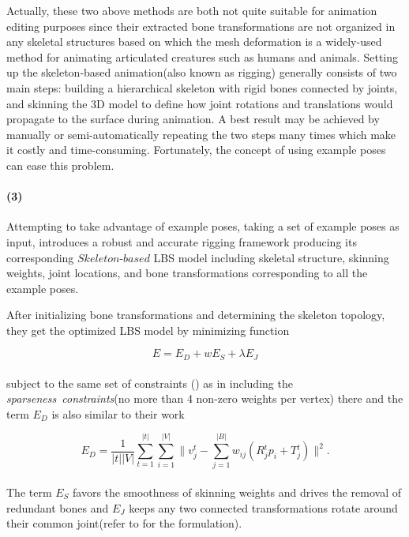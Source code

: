 \vspace{15pt}
Actually, these two above methods are both not quite suitable for animation editing purposes
since their extracted bone transformations are not organized in any skeletal structures
based on which the mesh deformation is a widely-used method for animating articulated creatures such as humans and animals.
Setting up the skeleton-based animation(also known as rigging) generally consists of two main steps:
building a hierarchical skeleton with rigid bones connected by joints,
and skinning the 3D model to define how joint rotations and translations would propagate to the surface during animation.
A best result may be achieved by manually or semi-automatically repeating the two steps many times which make it costly and time-consuming.
Fortunately, the concept of using example poses can ease this problem\cite{schaefer2007example}.

\paragraph{(3)}
Attempting to take advantage of example poses, taking a set of example poses as input,
\cite{le2014ras} introduces a robust and accurate rigging framework producing its corresponding $Skeleton$-$based$ LBS model including skeletal structure, skinning weights, joint locations, and bone transformations corresponding to all the example poses.

After initializing bone transformations and determining the skeleton topology, they get the optimized LBS model by minimizing function

\small{
\begin{equation}
 \label{eq:SkeletonLBS}
 E=E_{D}+wE_{S}+\lambda E_{J}
\end{equation}
}
\\
subject to the same set of constraints () as in \cite{le2012smooth} including the \textit{sparseness~constraints}(no more than 4 non-zero weights per vertex) there and  the term $E_{D}$ is also similar to their work

\small{
\begin{equation}
 \label{eq:SRFE}
 E_{D}=\frac{1}{|t||V|}
 \sum_{t=1}^{|t|} \sum_{i=1}^{|V|}
 \|v{_{j}^{t}}
 -\sum_{j=1}^{|B|} w_{ij} ( R{_{j}^{t}}p_{i} + T{_{j}^{t}} )
 \|^2.
\end{equation}
}
\\
The term $E_{S}$ favors the smoothness of skinning weights and drives the removal of redundant bones and $E_{J}$ keeps any two connected transformations rotate around their common joint(refer to\cite{le2014ras} for the formulation).

